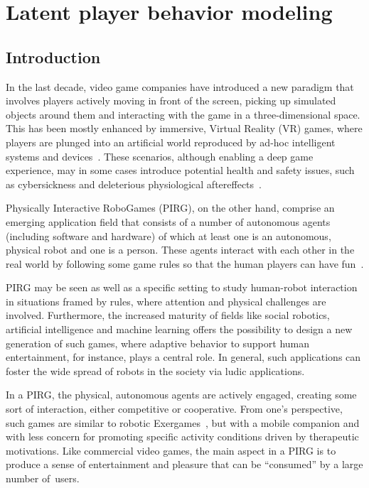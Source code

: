 \chapter{Latent player behavior modeling}

\section{Introduction}

In the last decade, video game companies have introduced a new paradigm that involves players actively moving in front of the screen, picking up simulated objects around them and interacting with the game in a three-dimensional space. This has been mostly enhanced by immersive, Virtual Reality (VR) games, where players are plunged into an artificial world reproduced by {ad-hoc} intelligent systems and devices~\cite{zyda_visual_2005}. These scenarios, although enabling a deep game experience, may in some cases introduce potential health and safety issues, such as cybersickness and deleterious physiological aftereffects~\cite{stanney_human_1998}.

Physically Interactive RoboGames (PIRG), on the other hand, comprise an emerging application field that consists of a number of autonomous agents (including software and hardware) of which at least one is an autonomous, physical robot and one is a person. These agents interact with each other in the real world by following some game rules so that the human players can have fun~\cite{martinoia_physically_2013}.

PIRG may be seen as well as a specific setting to study human-robot interaction in situations framed by rules, where attention and physical challenges are involved. Furthermore, the increased maturity of fields like social robotics, artificial intelligence and machine learning offers the possibility to design a new generation of such games, where adaptive behavior to support human entertainment, for instance, plays a central role. In general, such applications can foster the wide spread of robots in the society via ludic applications.

In a PIRG, the physical, autonomous agents are actively engaged, creating some sort of interaction, either competitive or cooperative. From one's perspective, such games are similar to robotic Exergames~\cite{di_tore_exergames_2012-1, di_tore_exergame-design_2012, di_tore_exergames_2012, huang_can_2017, cruickshank_exergames:_2017}, but with a mobile companion and with less concern for promoting specific activity conditions driven by therapeutic motivations. Like commercial video games, the main aspect in a PIRG is to produce a sense of entertainment and pleasure that can be ``consumed'' by a large number of~users. 

